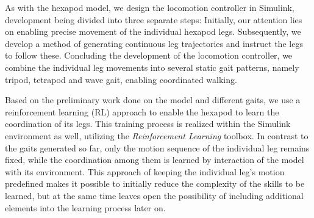 As with the hexapod model, we design the locomotion controller in Simulink, development being divided into three separate steps:
Initially, our attention lies on enabling precise movement of the individual hexapod legs.
Subsequently, we develop a method of generating continuous leg trajectories and instruct the legs to follow these.
Concluding the development of the locomotion controller, we combine the individual leg movements into several static gait patterns, namely tripod, tetrapod and wave gait, enabling coordinated walking.

Based on the preliminary work done on the model and different gaits, we use a reinforcement learning (RL) approach to enable the hexapod to learn the coordination of its legs.
This training process is realized within the Simulink environment as well, utilizing the \textit{Reinforcement Learning} toolbox.
In contrast to the gaits generated so far, only the motion sequence of the individual leg remains fixed, while the coordination among them is learned by interaction of the model with its environment. 
This approach of keeping the individual leg's motion predefined makes it possible to initially reduce the complexity of the skills to be learned, but at the same time leaves open the possibility of including additional elements into the learning process later on.

